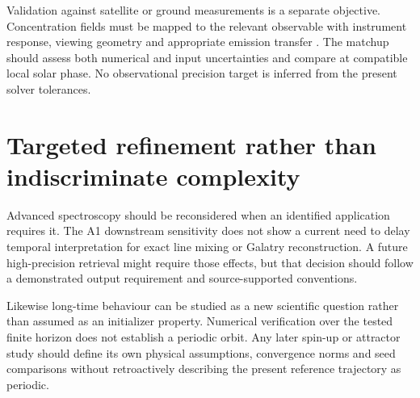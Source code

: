 Validation against satellite or ground measurements is a separate objective. Concentration fields must be mapped to the relevant observable with instrument response, viewing geometry and appropriate emission transfer \citep{li2020,mlynczak2007}. The matchup should assess both numerical and input uncertainties and compare at compatible local solar phase. No observational precision target is inferred from the present solver tolerances.

\section{Targeted refinement rather than indiscriminate complexity}
Advanced spectroscopy should be reconsidered when an identified application requires it. The A1 downstream sensitivity does not show a current need to delay temporal interpretation for exact line mixing or Galatry reconstruction. A future high-precision retrieval might require those effects, but that decision should follow a demonstrated output requirement and source-supported conventions.

Likewise long-time behaviour can be studied as a new scientific question rather than assumed as an initializer property. Numerical verification over the tested finite horizon does not establish a periodic orbit. Any later spin-up or attractor study should define its own physical assumptions, convergence norms and seed comparisons without retroactively describing the present reference trajectory as periodic.
